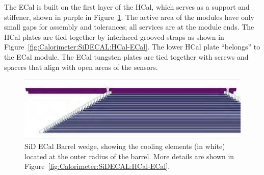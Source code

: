 The ECal is built on the first layer of the HCal, which serves as a support and
stiffener, shown in purple
in Figure~\ref{fig:Calorimeter:SiDECAL:ECalWedge}. The active area of the modules have only small gaps for assembly and tolerances; all services are at the
module ends. The HCal plates are tied together by interlaced grooved straps as shown in Figure~\ref{fig:Calorimeter:SiDECAL:HCal-ECal}. The lower HCal plate ``belongs'' to the ECal module. The ECal tungsten plates are tied together with screws and spacers that align with open areas of the sensors.

\begin{figure}
	\centering
	\begin{minipage}[b]{.75\textwidth}
		\includegraphics[width=\linewidth,valign=t]{Calorimeter/SiliconTungstenSiD/ECalWedge.png}
		\caption{SiD ECal Barrel wedge, showing the cooling elements (in white) located at the outer radius of the barrel. More details are shown in Figure~\ref{fig:Calorimeter:SiDECAL:HCal-ECal}.}
		\label{fig:Calorimeter:SiDECAL:ECalWedge}
	\end{minipage}\hfill
	\begin{minipage}[b]{.23\textwidth}

\end{minipage}
\end{figure}
